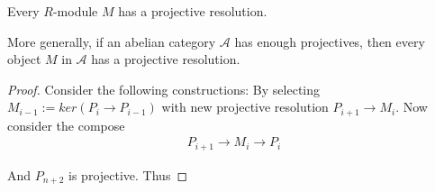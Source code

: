 \documentclass[Total.tex]{subfiles}
\begin{document}
				\begin{proposition}
					Every $R$-module $M$ has a projective resolution.
					
					More generally, if an abelian category $\mathcal{A}$ has enough projectives, then every object $M$ in $\mathcal{A}$ has a projective resolution.
				\end{proposition}
				\begin{proof}
					Consider the following constructions: By selecting $M_{i-1}:=ker(P_i\rightarrow P_{i-1})$ with new projective resolution $P_{i+1}\rightarrow M_i$. Now consider the compose 
					\begin{gather*}
						P_{i+1}\rightarrow M_i\rightarrow P_i
					\end{gather*}
					\begin{center}
					\end{center}
					
					And $P_{n+2}$ is projective. Thus 
					
					
					
				\end{proof}
				
\end{document}
